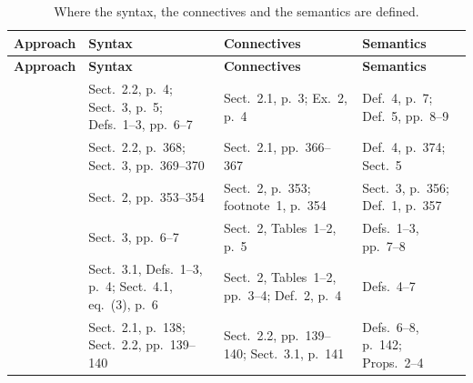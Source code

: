 {        \begin{longtable}{@{}p{}p{}p{}p{}@{}}
            \caption{Where the syntax, the connectives and the semantics are defined.}\label{tab:syntax-locations}                                                                                                     \\
            \toprule
            \textbf{Approach}           & \textbf{Syntax}                                       & \textbf{Connectives}                            & \textbf{Semantics}                                                 \\
            \midrule\endfirsthead
            \toprule
            \textbf{Approach}           & \textbf{Syntax}                                       & \textbf{Connectives}                            & \textbf{Semantics}                                                 \\
            \midrule\endhead
            \bottomrule\endfoot
            \cite{VanNieuwenborghDV06}  & Sect.~2.2, p.~4; Sect.~3, p.~5; Defs.~1--3, pp.~6--7  & Sect.~2.1, p.~3; Ex.~2, p.~4                    & Def.~4, p.~7; Def.~5, pp.~8--9                                     \\
            \cite{VanNieuwenborghDV07}  & Sect.~2.2, p.~368; Sect.~3, pp.~369--370              & Sect.~2.1, pp.~366--367                         & Def.~4, p.~374; Sect.~5                                            \\
            \cite{JanssenSVD09}         & Sect.~2, pp.~353--354                                 & Sect.~2, p.~353; footnote~1, p.~354             & Sect.~3, p.~356; Def.~1, p.~357                                    \\
            \cite{JanssenVSD12}         & Sect.~3, pp.~6--7                                     & Sect.~2, Tables~1--2, p.~5                      & Defs.~1--3, pp.~7--8                                               \\
            \cite{JanssenSVD12core}     & Sect.~3.1, Defs.~1--3, p.~4; Sect.~4.1, eq.~(3), p.~6 & Sect.~2, Tables~1--2, pp.~3--4; Def.~2, p.~4    & Defs.~4--7                                                         \\
            \cite{SchockaertJVD09}      & Sect.~2.1, p.~138; Sect.~2.2, pp.~139--140            & Sect.~2.2, pp.~139--140; Sect.~3.1, p.~141      & Defs.~6--8, p.~142; Props.~2--4                                    \\

\end{longtable}}
